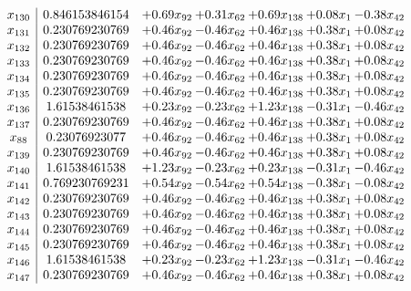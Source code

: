 \documentclass[8pt]{article}
\begin{document}
\[\begin{array}{c| c c@{\hskip 2pt} c@{\hskip 2pt} c@{\hskip 2pt} c@{\hskip 2pt} c@{\hskip 2pt} }
 x_{130}   &  0.846153846154 & +  0.69 x_{92} & +  0.31 x_{62} & +  0.69 x_{138} & +  0.08 x_{1} & -0.38 x_{42}\\
 x_{131}   &  0.230769230769 & +  0.46 x_{92} & -0.46 x_{62} & +  0.46 x_{138} & +  0.38 x_{1} & +  0.08 x_{42}\\
 x_{132}   &  0.230769230769 & +  0.46 x_{92} & -0.46 x_{62} & +  0.46 x_{138} & +  0.38 x_{1} & +  0.08 x_{42}\\
 x_{133}   &  0.230769230769 & +  0.46 x_{92} & -0.46 x_{62} & +  0.46 x_{138} & +  0.38 x_{1} & +  0.08 x_{42}\\
 x_{134}   &  0.230769230769 & +  0.46 x_{92} & -0.46 x_{62} & +  0.46 x_{138} & +  0.38 x_{1} & +  0.08 x_{42}\\
 x_{135}   &  0.230769230769 & +  0.46 x_{92} & -0.46 x_{62} & +  0.46 x_{138} & +  0.38 x_{1} & +  0.08 x_{42}\\
 x_{136}   &  1.61538461538 & +  0.23 x_{92} & -0.23 x_{62} & +  1.23 x_{138} & -0.31 x_{1} & -0.46 x_{42}\\
 x_{137}   &  0.230769230769 & +  0.46 x_{92} & -0.46 x_{62} & +  0.46 x_{138} & +  0.38 x_{1} & +  0.08 x_{42}\\
 x_{88}   &  0.23076923077 & +  0.46 x_{92} & -0.46 x_{62} & +  0.46 x_{138} & +  0.38 x_{1} & +  0.08 x_{42}\\
 x_{139}   &  0.230769230769 & +  0.46 x_{92} & -0.46 x_{62} & +  0.46 x_{138} & +  0.38 x_{1} & +  0.08 x_{42}\\
 x_{140}   &  1.61538461538 & +  1.23 x_{92} & -0.23 x_{62} & +  0.23 x_{138} & -0.31 x_{1} & -0.46 x_{42}\\
 x_{141}   &  0.769230769231 & +  0.54 x_{92} & -0.54 x_{62} & +  0.54 x_{138} & -0.38 x_{1} & -0.08 x_{42}\\
 x_{142}   &  0.230769230769 & +  0.46 x_{92} & -0.46 x_{62} & +  0.46 x_{138} & +  0.38 x_{1} & +  0.08 x_{42}\\
 x_{143}   &  0.230769230769 & +  0.46 x_{92} & -0.46 x_{62} & +  0.46 x_{138} & +  0.38 x_{1} & +  0.08 x_{42}\\
 x_{144}   &  0.230769230769 & +  0.46 x_{92} & -0.46 x_{62} & +  0.46 x_{138} & +  0.38 x_{1} & +  0.08 x_{42}\\
 x_{145}   &  0.230769230769 & +  0.46 x_{92} & -0.46 x_{62} & +  0.46 x_{138} & +  0.38 x_{1} & +  0.08 x_{42}\\
 x_{146}   &  1.61538461538 & +  0.23 x_{92} & -0.23 x_{62} & +  1.23 x_{138} & -0.31 x_{1} & -0.46 x_{42}\\
 x_{147}   &  0.230769230769 & +  0.46 x_{92} & -0.46 x_{62} & +  0.46 x_{138} & +  0.38 x_{1} & +  0.08 x_{42}\\

\end{array}\]
\end{document}
